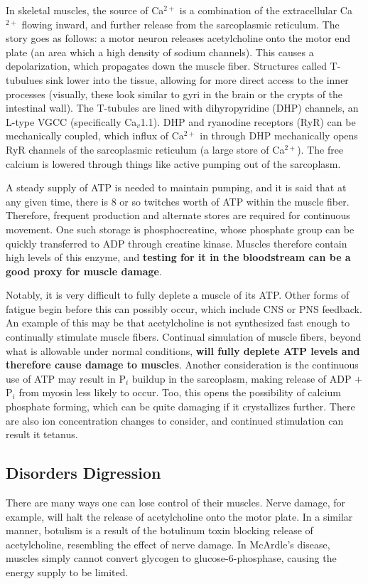\documentclass[12pt]{report}
\begin{document}
In skeletal muscles, the source of Ca$^{2+}$ is a combination of the extracellular Ca$^{2+}$ flowing inward, and further release from the sarcoplasmic reticulum. The story goes as follows: a motor neuron releases acetylcholine onto the motor end plate (an area which a high density of sodium channels). This causes a depolarization, which propagates down the muscle fiber. Structures called T-tubulues sink lower into the tissue, allowing for more direct access to the inner processes (visually, these look similar to gyri in the brain or the crypts of the intestinal wall). The T-tubules are lined with dihyropyridine (DHP) channels, an L-type VGCC (specifically Ca$_v$1.1). DHP and ryanodine receptors (RyR) can be mechanically coupled, which influx of Ca$^{2+}$ in through DHP mechanically opens RyR channels of the sarcoplasmic reticulum (a large store of Ca$^{2+}$). The free calcium is lowered through things like active pumping out of the sarcoplasm.\newline

A steady supply of ATP is needed to maintain pumping, and it is said that at any given time, there is 8 or so twitches worth of ATP within the muscle fiber. Therefore, frequent production and alternate stores are required for continuous movement. One such storage is phosphocreatine, whose phosphate group can be quickly transferred to ADP through creatine kinase. Muscles therefore contain high levels of this enzyme, and \textbf{testing for it in the bloodstream can be a good proxy for muscle damage}.\newline

Notably, it is very difficult to fully deplete a muscle of its ATP. Other forms of fatigue begin before this can possibly occur, which include CNS or PNS feedback. An example of this may be that acetylcholine is not synthesized fast enough to continually stimulate muscle fibers. Continual simulation of muscle fibers, beyond what is allowable under normal conditions, \textbf{will fully deplete ATP levels and therefore cause damage to muscles}. Another consideration is the continuous use of ATP may result in P$_i$ buildup in the sarcoplasm, making release of ADP $+$ P$_i$ from myosin less likely to occur. Too, this opens the possibility of calcium phosphate forming, which can be quite damaging if it crystallizes further. There are also ion concentration changes to consider, and continued stimulation can result it tetanus.

\subsection{Disorders Digression}
There are many ways one can lose control of their muscles. Nerve damage, for example, will halt the release of acetylcholine onto the motor plate. In a similar manner, botulism is a result of the botulinum toxin blocking release of acetylcholine, resembling the effect of nerve damage. In McArdle's disease, muscles simply cannot convert glycogen to glucose-6-phosphase, causing the energy supply to be limited. 
\end{document}
